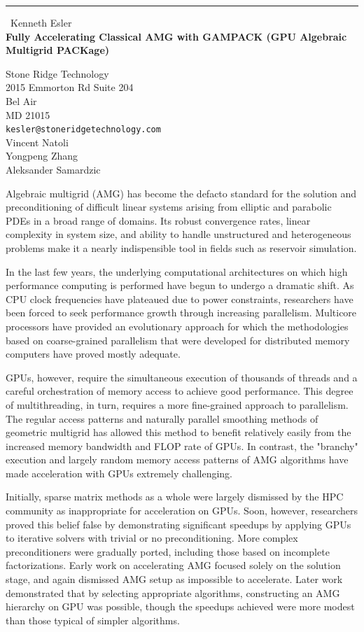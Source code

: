 \documentclass{report}
\begin{document}
\begin{center}
\rule{6in}{1pt} \
{\large Kenneth Esler \\
{\bf Fully Accelerating Classical AMG with GAMPACK (GPU Algebraic Multigrid PACKage)}}

Stone Ridge Technology \\ 2015 Emmorton Rd Suite 204 \\ Bel Air \\ MD 21015
\\
{\tt kesler@stoneridgetechnology.com}\\
Vincent Natoli\\
Yongpeng Zhang\\
Aleksander Samardzic\end{center}

Algebraic multigrid (AMG) has become the defacto standard for the
solution and preconditioning of difficult linear systems arising from
elliptic and parabolic PDEs in a broad range of domains. Its robust
convergence rates, linear complexity in system size, and ability to
handle unstructured and heterogeneous problems make it a nearly
indispensible tool in fields such as reservoir simulation.

In the last few years, the underlying computational architectures on
which high performance computing is performed have begun to undergo a
dramatic shift. As CPU clock frequencies have plateaued due to power
constraints, researchers have been forced to seek performance growth
through increasing parallelism. Multicore processors have provided an
evolutionary approach for which the methodologies based on coarse-grained
parallelism that were developed for distributed memory computers have
proved mostly adequate.

GPUs, however, require the simultaneous execution of thousands of
threads and a careful orchestration of memory access to achieve good
performance. This degree of multithreading, in turn, requires a more
fine-grained approach to parallelism. The regular access patterns and
naturally parallel smoothing methods of geometric multigrid has allowed
this method to benefit relatively easily from the increased memory
bandwidth and FLOP rate of GPUs. In contrast, the "branchy" execution and
largely random memory access patterns of AMG algorithms have made
acceleration with GPUs extremely challenging.

Initially, sparse matrix methods as a whole were largely dismissed by the
HPC community as inappropriate for acceleration on GPUs. Soon, however,
researchers proved this belief false by demonstrating significant
speedups by applying GPUs to iterative solvers with trivial or no
preconditioning. More complex preconditioners were gradually ported,
including those based on incomplete factorizations. Early work on
accelerating AMG focused solely on the solution stage, and again
dismissed AMG setup as impossible to accelerate. Later work demonstrated
that by selecting appropriate algorithms, constructing an AMG hierarchy
on GPU was possible, though the speedups achieved were more modest than
those typical of simpler algorithms.
\end{document}
